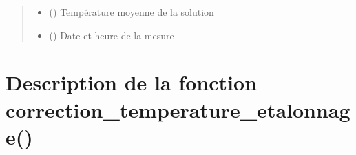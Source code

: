 \documentclass[letterpaper,10pt,french]{sphinxmanual}
\begin{document}
\begin{fulllineitems}
\begin{quote}
\begin{description}
\begin{itemize}
\item {} 
\sphinxAtStartPar
{} () \textendash{} Température moyenne de la solution

\item {} 
\sphinxAtStartPar
{} () \textendash{} Date et heure de la mesure

\end{itemize}


\end{description}\end{quote}

\end{fulllineitems}



\section{Description de la fonction correction\_temperature\_etalonnage()}
\label{\detokenize{Documentation:description-de-la-fonction-correction-temperature-etalonnage}}
\end{document}

